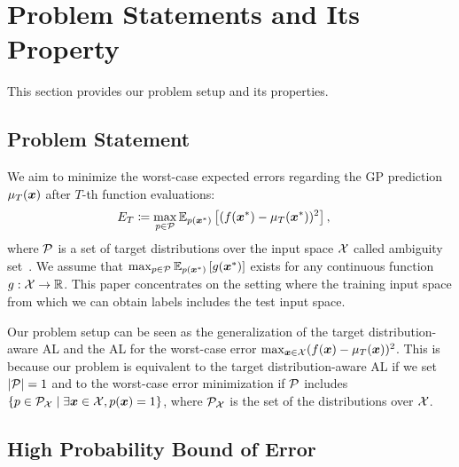 \section{Problem Statements and Its Property}
\label{sec:problem}

This section provides our problem setup and its properties.

\subsection{Problem Statement}

We aim to minimize the worst-case expected errors regarding the GP prediction $\mu_T (\boldsymbol{x})$ after $T$-th function evaluations:
\begin{align}
    E_T &\coloneqq \max_{p \in {\cal P}} \mathbb{E}_{p(\boldsymbol{x}^{*})} \left[ ( f(\boldsymbol{x}^{*}) - \mu_T(\boldsymbol{x}^{*}) )^2 \right],
    \label{eq:target_error}
\end{align}
where ${\cal P}$ is a set of target distributions over the input space ${\cal X}$ called ambiguity set~\citep{chen2020distributionally}.
%
We assume that $\max_{p \in {\cal P}} \mathbb{E}_{p(\boldsymbol{x}^*)} \left[ g(\boldsymbol{x}^*) \right]$ exists for any continuous function $g: {\cal X} \rightarrow \mathbb{R}$.
%
This paper concentrates on the setting where the training input space from which we can obtain labels includes the test input space.



Our problem setup can be seen as the generalization of the target distribution-aware AL and the AL for the worst-case error $\max_{\boldsymbol{x} \in {\cal X}} ( f(\boldsymbol{x}) - \mu_T(\boldsymbol{x}) )^2$.
%
This is because our problem is equivalent to the target distribution-aware AL if we set $|{\cal P}| = 1$ and to the worst-case error minimization if ${\cal P}$ includes $\{p \in {\cal P}_{{\cal X}} \mid \exists \boldsymbol{x} \in {\cal X}, p(\boldsymbol{x}) = 1 \}$, where ${\cal P}_{\rm {\cal X}}$ is the set of the distributions over ${\cal X}$.


\subsection{High Probability Bound of Error}

